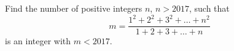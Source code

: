 Find the number of positive integers $n$, $n>2017$, such that \[m=\frac{1^2+2^2+3^2+\ldots+n^2}{1+2+3+\ldots+n}\] is an integer with $m<2017$.